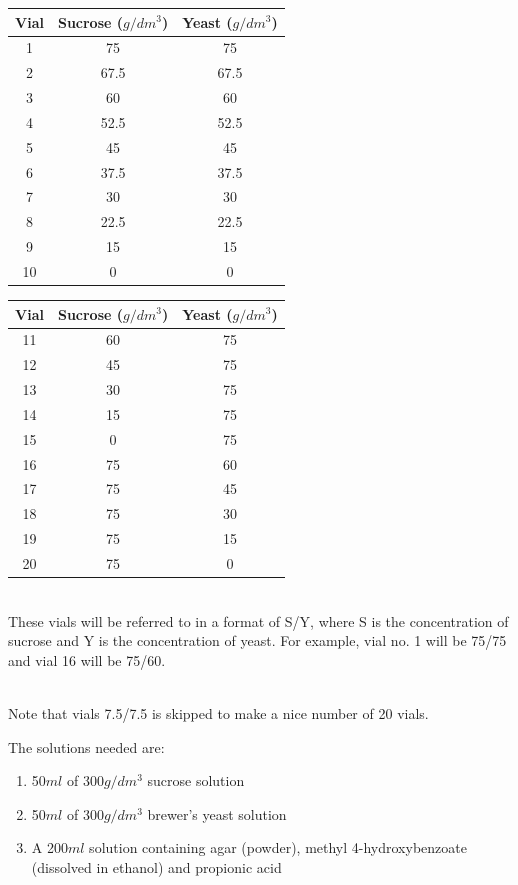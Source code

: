 \documentclass{article}
\begin{document}
{
\centering
\begin{tabular}{|c|c|c|}
  \hline
  Vial & Sucrose ($g/dm^3$) & Yeast ($g/dm^3$)\\
  \hline
  \hline
  1 & 75 & 75\\
  2 & 67.5 & 67.5\\
  3 & 60 & 60\\
  4 & 52.5 & 52.5\\
  5 & 45 & 45\\
  6 & 37.5 & 37.5\\
  7 & 30 & 30\\
  8 & 22.5 & 22.5\\
  9 & 15 & 15\\
  10 & 0 & 0\\
  \hline
\end{tabular}
\begin{tabular}{|c|c|c|}
  \hline
  Vial & Sucrose ($g/dm^3$) & Yeast ($g/dm^3$)\\
  \hline
  \hline
  11 & 60 & 75\\
  12 & 45 & 75\\
  13 & 30 & 75\\
  14 & 15 & 75\\
  15 & 0 & 75\\
  \hline
  16 & 75 & 60\\
  17 & 75 & 45\\
  18 & 75 & 30\\
  19 & 75 & 15\\
  20 & 75 & 0\\
  \hline
\end{tabular}
\par
}
\noindent\\
These vials will be referred to in a format of S/Y, where S is the concentration of sucrose and Y is the concentration of yeast. For example, vial no. 1 will be 75/75 and vial 16 will be 75/60.

\noindent\\
Note that vials 7.5/7.5 is skipped to make a nice number of 20 vials.

\newpage
\noindent
The solutions needed are:

\begin{enumerate}
  \item 50$ml$ of 300$g/dm^3$ sucrose solution
  \item 50$ml$ of 300$g/dm^3$ brewer's yeast solution
  \item A 200$ml$ solution containing agar (powder), methyl 4-hydroxybenzoate (dissolved in ethanol) and propionic acid
\end{enumerate}
\end{document}
